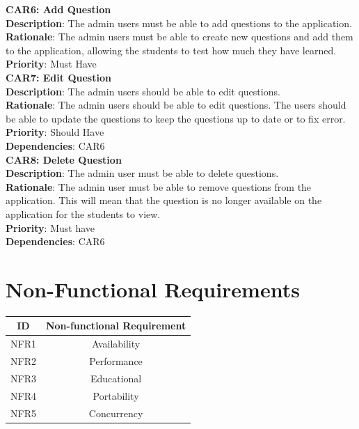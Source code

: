 \documentclass{l3proj}
\begin{document}
\textbf{CAR6: Add Question}\\
\textbf{Description}: The admin users must be able to add questions to the application. \\
\textbf{Rationale}: The admin users must be able to create new questions and add them to the application, allowing the students to test how much they have learned.\\
\textbf{Priority}: Must Have\\

\textbf{CAR7: Edit Question}\\
\textbf{Description}: The admin users should be able to edit questions.\\
\textbf{Rationale}: The admin users should be able to edit questions. The users should be able to update the questions to keep the questions up to date or to fix error.\\
\textbf{Priority}: Should Have \\
\textbf{Dependencies}: CAR6\\

\textbf{CAR8: Delete Question}\\
\textbf{Description}: The admin user must be able to delete questions. \\
\textbf{Rationale}:  The admin user must be able to remove questions from the application. This will mean that the question is no longer available on the application for the students to view.\\
\textbf{Priority}: Must have\\
\textbf{Dependencies}: CAR6\\

\section{Non-Functional Requirements}

\begin{center}
\begin{tabular}{|c|c|}
\hline \textbf{ID} & \textbf{Non-functional Requirement}\\
\hline NFR1 & Availability\\
\hline NFR2 & Performance\\
\hline NFR3 & Educational\\
\hline NFR4 & Portability\\
\hline NFR5 & Concurrency\\
\hline
\end{tabular}
\end{center}
\end{document}
